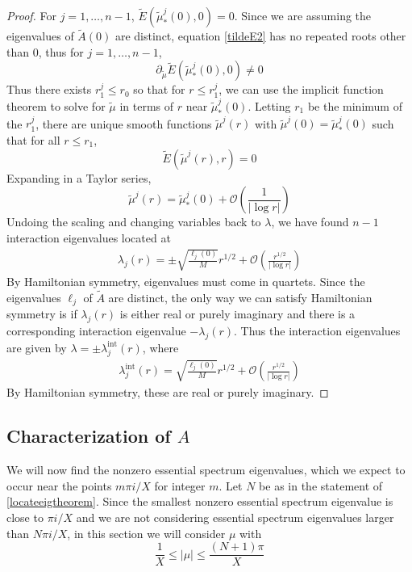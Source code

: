 \documentclass[thesis.tex]{subfiles}
\begin{document}
\begin{lemma}
\begin{proof}
For $j = 1, \dots, n-1$, $\tilde{E}(\tilde{\mu}_*^j(0), 0) = 0$. Since we are assuming the eigenvalues of $\tilde{A}(0)$ are distinct, equation \cref{tildeE2} has no repeated roots other than $0$, thus for $j = 1, \dots, n-1$,
\[
\partial_{\tilde{\mu}} \tilde{E}(\tilde{\mu}_*^j(0), 0) \neq 0
\]
Thus there exists $r_1^j \leq r_0$ so that for $r \leq r_1^j$, we can use the implicit function theorem to solve for $\tilde{\mu}$ in terms of $r$ near $\tilde{\mu}_*^j(0)$. Letting $r_1$ be the minimum of the $r_1^j$, there are unique smooth functions $\tilde{\mu}^j(r)$ with $\tilde{\mu}^j(0) = \tilde{\mu}_*^j(0)$ such that for all $r \leq r_1$,
\[
\tilde{E}(\tilde{\mu}^j(r), r) = 0
\]
Expanding in a Taylor series,
\[
\tilde{\mu}^j(r) = \tilde{\mu}_*^j(0) + \mathcal{O}\left( \frac{1}{|\log r|} \right)
\]
Undoing the scaling and changing variables back to $\lambda$, we have found $n-1$ interaction eigenvalues located at
\begin{align*}
\lambda_j(r) = \pm \sqrt{\frac{\ell_j(0)}{M}} r^{1/2} + \mathcal{O}\left( \frac{r^{1/2}}{|\log r|} \right)
\end{align*}
By Hamiltonian symmetry, eigenvalues must come in quartets. Since the eigenvalues $\ell_j$ of $\tilde{A}$ are distinct, the only way we can satisfy Hamiltonian symmetry is if $\lambda_j(r)$ is either real or purely imaginary and there is a corresponding interaction eigenvalue $-\lambda_j(r)$. Thus the interaction eigenvalues are given by $\lambda = \pm \lambda^{\text{int}}_j(r)$, where
\begin{align*}
\lambda^{\text{int}}_j(r) = \sqrt{\frac{\ell_j(0)}{M}} r^{1/2} + \mathcal{O}\left( \frac{r^{1/2}}{|\log r|} \right)
\end{align*}
By Hamiltonian symmetry, these are real or purely imaginary.
\end{proof}
\end{lemma}

\subsection{Characterization of $A$ }

We will now find the nonzero essential spectrum eigenvalues, which we expect to occur near the points $m \pi i/X$ for integer $m$. Let $N$ be as in the statement of \cref{locateeigtheorem}. Since the smallest nonzero essential spectrum eigenvalue is close to $\pi i/X$ and we are not considering essential spectrum eigenvalues larger than $N \pi i/X$, in this section we will consider $\mu$ with
\begin{equation}\label{mucondess}
\frac{1}{X} \leq |\mu| \leq \frac{(N+1)\pi}{X}
\end{equation}
\end{document}
